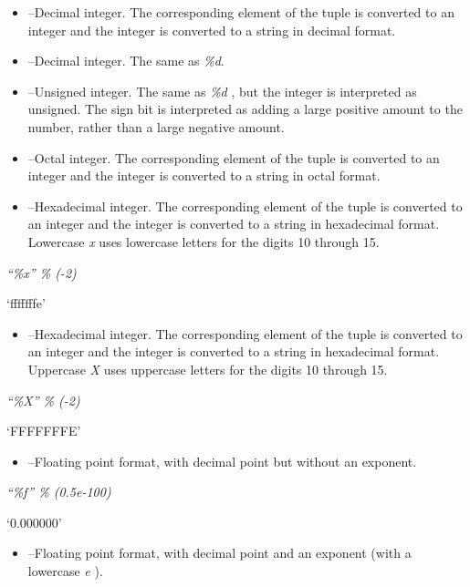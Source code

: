 \begin{itemize}

\item
   --Decimal integer. The
  corresponding element of the tuple is converted to an integer and the
  integer is converted to a string in decimal format.
\item
   --Decimal integer. The
  same as \emph{\%d}.
\item
   --Unsigned integer. The
  same as \emph{\%d} , but the integer is interpreted as unsigned. The
  sign bit is interpreted as adding a large positive amount to the
  number, rather than a large negative amount.
\item
   --Octal integer. The
  corresponding element of the tuple is converted to an integer and the
  integer is converted to a string in octal format.
\item
   --Hexadecimal integer.
  The corresponding element of the tuple is converted to an integer and
  the integer is converted to a string in hexadecimal format. Lowercase
  \emph{x} uses lowercase letters for the digits 10 through 15.
\end{itemize}


\emph{``\%x'' \% (-2)}

`fffffffe'

\begin{itemize}

\item
   --Hexadecimal integer.
  The corresponding element of the tuple is converted to an integer and
  the integer is converted to a string in hexadecimal format. Uppercase
  \emph{X} uses uppercase letters for the digits 10 through 15.
\end{itemize}


\emph{``\%X'' \% (-2)}

`FFFFFFFE'

\begin{itemize}

\item
   --Floating point
  format, with decimal point but without an exponent.
\end{itemize}


\emph{``\%f'' \% (0.5e-100)}

`0.000000'

\begin{itemize}

\item
   --Floating point
  format, with decimal point and an exponent (with a lowercase \emph{e}
  ).
\end{itemize}


